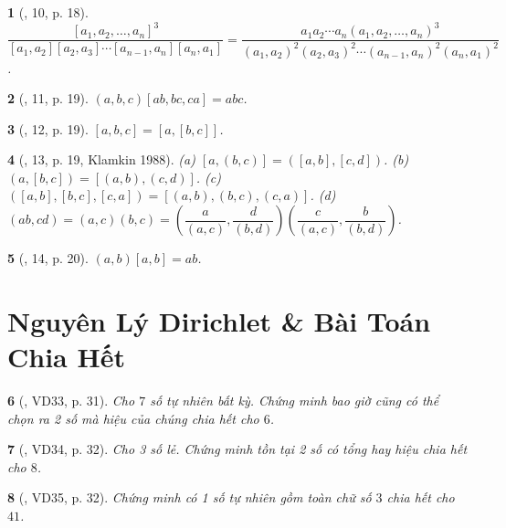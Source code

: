 \documentclass{article}
\newtheorem{baitoan}{}
\begin{document}
\begin{baitoan}[\cite{Giang_sang_tao_so_hoc}, 10, p. 18]
	$\dfrac{[a_1,a_2,\ldots,a_n]^3}{[a_1,a_2][a_2,a_3]\cdots[a_{n-1},a_n][a_n,a_1]} = \dfrac{a_1a_2\cdots a_n(a_1,a_2,\ldots,a_n)^3}{(a_1,a_2)^2(a_2,a_3)^2\cdots(a_{n-1},a_n)^2(a_n,a_1)^2}$.
\end{baitoan}

\begin{baitoan}[\cite{Giang_sang_tao_so_hoc}, 11, p. 19]
	$(a,b,c)[ab,bc,ca] = abc$.
\end{baitoan}

\begin{baitoan}[\cite{Giang_sang_tao_so_hoc}, 12, p. 19]
	$[a,b,c] = [a,[b,c]]$.
\end{baitoan}

\begin{baitoan}[\cite{Giang_sang_tao_so_hoc}, 13, p. 19, Klamkin 1988]
	(a) $[a,(b,c)] = ([a,b],[c,d])$. (b) $(a,[b,c]) = [(a,b),(c,d)]$. (c) $([a,b],[b,c],[c,a]) = [(a,b),(b,c),(c,a)]$. (d) $(ab,cd) = (a,c)(b,c) = \left(\dfrac{a}{(a,c)},\dfrac{d}{(b,d)}\right)\left(\dfrac{c}{(a,c)},\dfrac{b}{(b,d)}\right)$.
\end{baitoan}

\begin{baitoan}[\cite{Giang_sang_tao_so_hoc}, 14, p. 20]
	$(a,b)[a,b] = ab$.
\end{baitoan}


\section{Nguyên Lý Dirichlet \& Bài Toán Chia Hết}

\begin{baitoan}[\cite{Tuyen_Toan_6}, VD33, p. 31]
	Cho $7$ số tự nhiên bất kỳ. Chứng minh bao giờ cũng có thể chọn ra 2 số mà hiệu của chúng chia hết cho $6$.
\end{baitoan}

\begin{baitoan}[\cite{Tuyen_Toan_6}, VD34, p. 32]
	Cho 3 số lẻ. Chứng minh tồn tại 2 số có tổng hay hiệu chia hết cho $8$.
\end{baitoan}

\begin{baitoan}[\cite{Tuyen_Toan_6}, VD35, p. 32]
	Chứng minh có 1 số tự nhiên gồm toàn chữ số $3$ chia hết cho $41$.
\end{baitoan}
\end{document}
